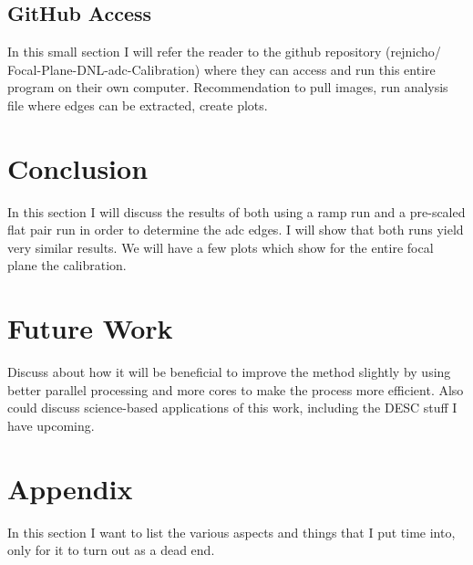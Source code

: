 \documentclass[11pt, letterpaper]{article}
\begin{document}
\subsection{GitHub Access}
In this small section I will refer the reader to the github repository (rejnicho/
Focal-Plane-DNL-adc-Calibration) where they can access and run this entire program on their own computer. Recommendation to pull images, run analysis file where edges can be extracted, create plots. 

\section{Conclusion}
In this section I will discuss the results of both using a ramp run and a pre-scaled flat pair run in order to determine the adc edges. I will show that both runs yield very similar results. We will have a few plots which show for the entire focal plane the calibration. 

\section{Future Work}
Discuss about how it will be beneficial to improve the method slightly by using better parallel processing and more cores to make the process more efficient. Also could discuss science-based applications of this work, including the DESC stuff I have upcoming.

\section{Appendix}
In this section I want to list the various aspects and things that I put time into, only for it to turn out as a dead end. 
\end{document}
